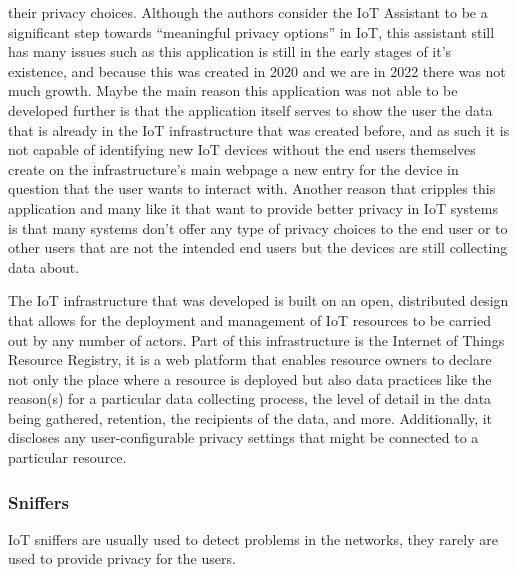 \documentclass[conference]{IEEEtran}
\begin{document}
their privacy choices. Although the authors consider the IoT Assistant to
be a significant step towards ``meaningful privacy options'' in IoT, this
assistant still has many issues such as this application is still in the
early stages of it's existence, and because this was created in 2020 and
we are in 2022 there was not much growth. Maybe the main reason this application
was not able to be developed further is that the application itself serves
to show the user the data that is already in the IoT infrastructure that was
created before, and as such it is not capable of identifying new IoT devices
without the end users themselves create on the infrastructure's main webpage \cite{DasPersonalized}
a new entry for the device in question that the user wants to interact with.
Another reason that cripples this application and many like it that want to
provide better privacy in IoT systems is that many systems don't offer any
type of privacy choices to the end user or to other users that are not the
intended end users but the devices are still collecting data about.

The IoT infrastructure that was developed \cite{DasPersonalized} is built
on an open, distributed design that allows for the deployment and management
of IoT resources to be carried out by any number of actors. Part of this
infrastructure is the Internet of Things Resource Registry, it is a web platform
that enables resource owners to declare not only the place where a resource
is deployed but also data practices like the reason(s) for a particular data
collecting process, the level of detail in the data being gathered, retention,
the recipients of the data, and more. Additionally, it discloses any user-configurable
privacy settings that might be connected to a particular resource.

\subsubsection{Sniffers}

IoT sniffers are usually used to detect problems in the networks, they rarely
are used to provide privacy for the users.
\end{document}
